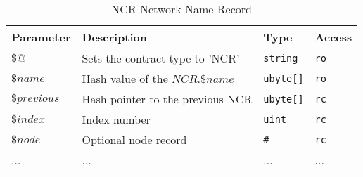 \begin{table}[H]
\begin{center}
\begin{tabular}{|l|p{7cm}|p{1.5cm}|l|}
      \hline
      Parameter & Description & Type & Access \\
      \hline
      $\$@$ & Sets the contract type to 'NCR' &  \texttt{string} & \texttt{ro} \\
      \hline
      $\$name$ & Hash value of the $NCR.\$name$ & \texttt{ubyte[]} & \texttt{ro} \\
      \hline
      $\$previous$ & Hash pointer to the previous NCR & \texttt{ubyte[]} & \texttt{rc} \\
      \hline
      $\$index$ & Index number & \texttt{uint} & \texttt{rc} \\
      \hline
      $\$node$ & Optional node record & \texttt{\#} & \texttt{rc} \\
      \hline
      ... & ... &  ... &  ... \\
      \hline
  \end{tabular}
\end{center}
\caption{NCR Network Name Record} 
\label{tab:ncr}
\end{table}


